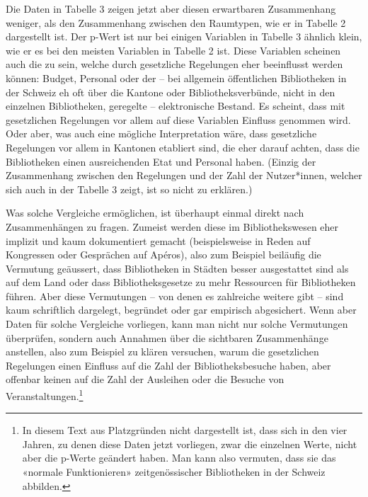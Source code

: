 \documentclass[a4paper,
fontsize=11pt,
oneside,
numbers=noperiodatend,
parskip=half-,
bibliography=totoc,
final
]{scrartcl}
\begin{document}
Die Daten in Tabelle 3 zeigen jetzt aber diesen erwartbaren Zusammenhang
weniger, als den Zusammenhang zwischen den Raumtypen, wie er in Tabelle
2 dargestellt ist. Der p-Wert ist nur bei einigen Variablen in Tabelle 3
ähnlich klein, wie er es bei den meisten Variablen in Tabelle 2 ist.
Diese Variablen scheinen auch die zu sein, welche durch gesetzliche
Regelungen eher beeinflusst werden können: Budget, Personal oder der --
bei allgemein öffentlichen Bibliotheken in der Schweiz eh oft über die
Kantone oder Bibliotheksverbünde, nicht in den einzelnen Bibliotheken,
geregelte -- elektronische Bestand. Es scheint, dass mit gesetzlichen
Regelungen vor allem auf diese Variablen Einfluss genommen wird. Oder
aber, was auch eine mögliche Interpretation wäre, dass gesetzliche
Regelungen vor allem in Kantonen etabliert sind, die eher darauf achten,
dass die Bibliotheken einen ausreichenden Etat und Personal haben.
(Einzig der Zusammenhang zwischen den Regelungen und der Zahl der
Nutzer*innen, welcher sich auch in der Tabelle 3 zeigt, ist so nicht zu
erklären.)

Was solche Vergleiche ermöglichen, ist überhaupt einmal direkt nach
Zusammenhängen zu fragen. Zumeist werden diese im Bibliothekswesen eher
implizit und kaum dokumentiert gemacht (beispielsweise in Reden auf
Kongressen oder Gesprächen auf Apéros), also zum Beispiel beiläufig die
Vermutung geäussert, dass Bibliotheken in Städten besser ausgestattet
sind als auf dem Land oder dass Bibliotheksgesetze zu mehr Ressourcen
für Bibliotheken führen. Aber diese Vermutungen -- von denen es
zahlreiche weitere gibt -- sind kaum schriftlich dargelegt, begründet
oder gar empirisch abgesichert. Wenn aber Daten für solche Vergleiche
vorliegen, kann man nicht nur solche Vermutungen überprüfen, sondern
auch Annahmen über die sichtbaren Zusammenhänge anstellen, also zum
Beispiel zu klären versuchen, warum die gesetzlichen Regelungen einen
Einfluss auf die Zahl der Bibliotheksbesuche haben, aber offenbar keinen
auf die Zahl der Ausleihen oder die Besuche von
Veranstaltungen.\footnote{In diesem Text aus Platzgründen nicht
  dargestellt ist, dass sich in den vier Jahren, zu denen diese Daten
  jetzt vorliegen, zwar die einzelnen Werte, nicht aber die p-Werte
  geändert haben. Man kann also vermuten, dass sie das «normale
  Funktionieren» zeitgenössischer Bibliotheken in der Schweiz abbilden.}
\end{document}
